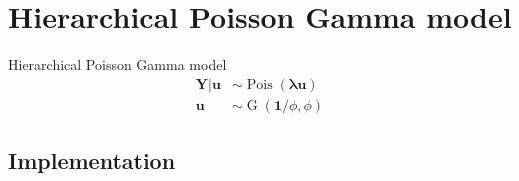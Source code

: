\documentclass[aspectratio=169]{beamer}
\DeclareMathOperator{\G}{G}
\DeclareMathOperator{\Pois}{Pois}
\begin{document}
\hypertarget{hierarchical-poisson-gamma-model}{%
\section{Hierarchical Poisson Gamma
model}\label{hierarchical-poisson-gamma-model}}

\begin{frame}{Hierarchical Poisson Gamma model}
\begin{subequations} \label{eq:PoisGam}
  \begin{alignat}{2}
    \boldsymbol{Y|u} &\sim \Pois (\boldsymbol{\lambda u}) \label{eq:pois_g0} \\ 
    \boldsymbol{u} &\sim \G(\boldsymbol 1/\phi,\phi) \label{eq:pois_g1}
  \end{alignat}
\end{subequations}
\end{frame}

\hypertarget{implementation-1}{%
\subsection{Implementation}\label{implementation-1}}
\end{document}
